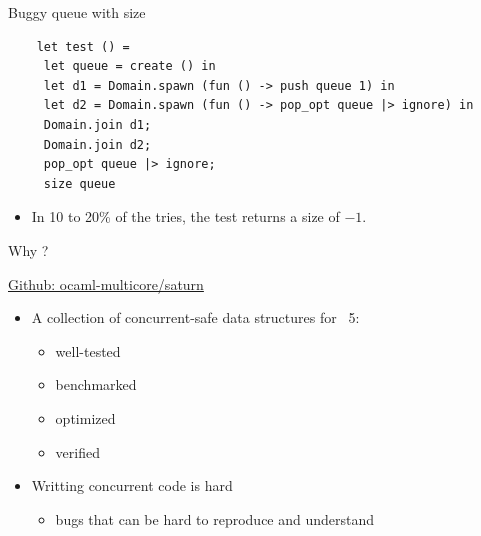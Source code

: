 \begin{frame}[fragile]{Buggy queue with size}
    \begin{lstlisting}
    let test () =
     let queue = create () in
     let d1 = Domain.spawn (fun () -> push queue 1) in 
     let d2 = Domain.spawn (fun () -> pop_opt queue |> ignore) in 
     Domain.join d1;
     Domain.join d2;
     pop_opt queue |> ignore;
     size queue
    \end{lstlisting}

    \begin{itemize}
        \item<2-> In 10 to 20\% of the tries, the test returns a size of $-1$. 
    \end{itemize}
\end{frame}

\begin{frame}{Why \Saturn ?}
    \hfill\small{\href{https://github.com/ocaml-multicore/saturn}{Github: ocaml-multicore/saturn}
    \vfill
        \begin{itemize}[label=$\bullet$]
            \item A collection of concurrent-safe data structures for \OCaml~5: 
            \begin{itemize}[label=$\diamond$]
                \item well-tested
                \item benchmarked
                \item optimized
                \item verified
            \end{itemize}
            \item Writting concurrent code is hard 
            \begin{itemize}[label=$\diamond$]
                \item bugs that can be hard to reproduce and understand
            \end{itemize}  
        \end{itemize}
        }
        \vfill
\end{frame}

